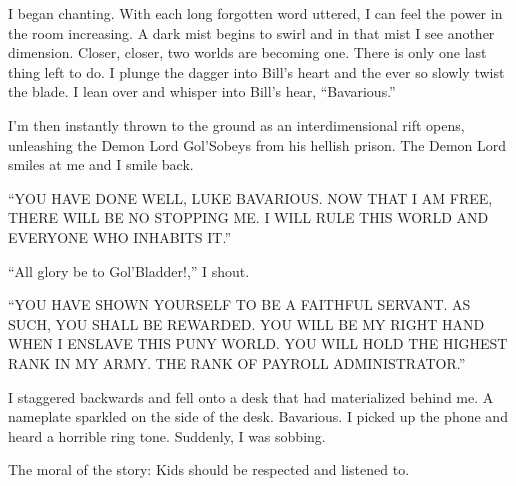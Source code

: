 I began chanting. With each long forgotten word uttered, I can feel
the power in the room increasing. A dark mist begins to swirl and
in that mist I see another dimension. Closer, closer, two worlds
are becoming one. There is only one last thing left to do. I plunge
the dagger into Bill's heart and the ever so slowly twist the
blade. I lean over and whisper into Bill's hear, ``Bavarious.''



I'm then instantly thrown to the ground as an interdimensional rift
opens, unleashing the Demon Lord Gol'Sobeys from his hellish
prison. The Demon Lord smiles at me and I smile back.



``YOU HAVE DONE WELL, LUKE BAVARIOUS. NOW THAT I AM FREE, THERE WILL
BE NO STOPPING ME. I WILL RULE THIS WORLD AND EVERYONE WHO INHABITS
IT.''



``All glory be to Gol'Bladder!,'' I shout.



``YOU HAVE SHOWN YOURSELF TO BE A FAITHFUL SERVANT. AS SUCH, YOU
SHALL BE REWARDED. YOU WILL BE MY RIGHT HAND WHEN I ENSLAVE THIS
PUNY WORLD. YOU WILL HOLD THE HIGHEST RANK IN MY ARMY. THE RANK OF
PAYROLL ADMINISTRATOR.''



I staggered backwards and fell onto a desk that had materialized
behind me. A nameplate sparkled on the side of the desk. Bavarious.
I picked up the phone and heard a horrible ring tone. Suddenly, I
was sobbing.



The moral of the story: Kids should be respected and listened
to.



